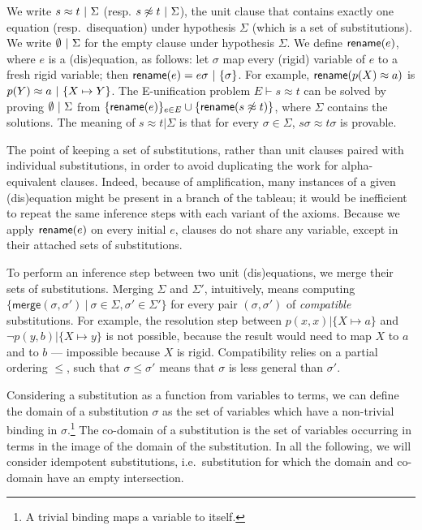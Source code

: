 We write $  s \approx t  ~|~  \Sigma$
(resp. $  s \not\approx t  ~|~  \Sigma$),
the unit clause that contains exactly one equation (resp.~disequation)
under hypothesis $\Sigma$ (which is a set of substitutions).
We write $\emptyset ~|~ \Sigma$ for the empty clause under hypothesis $\Sigma$.
We define $\textsf{rename}(e)$, where $e$ is a (dis)equation, as follows:
let $\sigma$ map every (rigid) variable of $e$ to a fresh rigid variable;
then $\textsf{rename}(e) =  e\sigma  ~|~  \{ \sigma \} $.
For example, $\textsf{rename}(p(X)\approx a)$
is $ p(Y)\approx a ~|~  \{ X\mapsto Y\} $. %
The E-unification problem $E \vdash s\approx t$ can be solved by
proving $\emptyset  ~|~  \Sigma$
from $\{ \textsf{rename}(e) \}_{ e \in E }
\cup
\{ \textsf{rename}( s \not\approx t ) \}$,
where $\Sigma$ contains the solutions.
The meaning of $s \approx t | \Sigma$ is that for every $\sigma \in \Sigma$,
$s\sigma \approx t\sigma$ is provable.

The point of keeping a set of substitutions, rather than unit clauses paired with
individual substitutions, in order to avoid duplicating the work
for alpha-equivalent clauses.
Indeed, because of amplification, many instances of a given (dis)equation
might be present in a branch of the tableau;
it would be inefficient to repeat the same inference steps with each variant
of the axioms.
Because we apply $\textsf{rename}(e)$ on every initial $e$, clauses do not
share any variable, except in their attached sets of substitutions.

To perform an inference step between two unit (dis)equations, we merge their
sets of substitutions.
Merging $\Sigma$ and $\Sigma'$, intuitively, means
computing $\{ \textsf{merge}(\sigma,\sigma') ~|~ \sigma \in \Sigma, \sigma'\in \Sigma' \}$
for every pair $(\sigma,\sigma')$ of {\em compatible} substitutions.
For example, the resolution step between $p(x,x)| \{ X \mapsto a \}$
and $\lnot p(y,b)| \{ X \mapsto y \}$ is not possible, because the result
would need to map $X$ to $a$ and to $b$  --- impossible because $X$ is rigid.
Compatibility relies on a partial ordering $\leq$,
such that $\sigma \leq \sigma'$ means that $\sigma$ is
less general than $\sigma'$.

Considering a substitution as a function from variables to terms, we can define
the domain of a substitution $\sigma$ as the set of variables which have a non-trivial
binding in $\sigma$.\footnote{A trivial binding maps a variable to itself.}
The co-domain of a substitution is the set of variables occurring in terms in the image of
the domain of the substitution.
In all the following, we will consider idempotent substitutions, i.e.~substitution for which
the domain and co-domain have an empty intersection.

